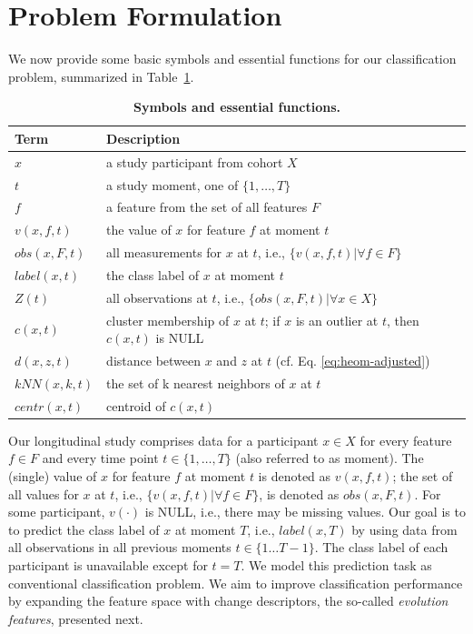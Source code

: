 \documentclass[
  oneside]{book}
\begin{document}
\hypertarget{evo-problem-formulation}{%
\section{Problem Formulation}\label{evo-problem-formulation}}

We now provide some basic symbols and essential functions for our classification problem, summarized in Table~\ref{tab:06-nomenclature}.



\begin{table}

\caption{\label{tab:06-nomenclature}\textbf{Symbols and essential functions.}}
\centering
\begin{tabular}[t]{ll}
\toprule
\textbf{Term} & \textbf{Description}\\
\midrule
$x$ & a study participant from cohort $X$\\
$t$ & a study moment, one of $\{1,\ldots, T\}$\\
$f$ & a feature from the set of all features $F$\\
$v(x,f,t)$ & the value of $x$ for feature $f$ at moment $t$\\
$obs(x,F,t)$ & all measurements for $x$ at $t$, i.e., $\{v(x,f,t)|\forall f\in{}F\}$\\
$label(x,t)$ & the class label of $x$ at moment $t$\\
$Z(t)$ & all observations at $t$, i.e., $\{obs(x,F,t)| \forall x \in X\}$\\
$c(x,t)$ & cluster membership of $x$ at $t$; if $x$ is an outlier at $t$, then $c(x,t)$ is NULL\\
$d(x,z,t)$ & distance between $x$ and $z$ at $t$ (cf. Eq. \ref{eq:heom-adjusted})\\
$kNN(x,k,t)$ & the set of k nearest neighbors of $x$ at  $t$\\
$centr(x,t)$ & centroid of $c(x,t)$\\
\bottomrule
\end{tabular}
\end{table}

Our longitudinal study comprises data for a participant \(x\in X\) for every feature \(f\in F\) and every time point \(t\in \{1,\ldots, T\}\) (also referred to as moment).
The (single) value of \(x\) for feature \(f\) at moment \(t\) is denoted as \(v(x,f,t)\);
the set of all values for \(x\) at \(t\), i.e., \(\{v(x,f,t)|\forall f\in{}F\}\), is denoted as \(obs(x,F,t)\).
For some participant, \(v(\cdot)\) is NULL, i.e., there may be missing values.
Our goal is to to predict the class label of \(x\) at moment \(T\), i.e., \(label(x,T)\) by using data from all observations in all previous moments \(t\in\{1\ldots T-1\}\).
The class label of each participant is unavailable except for \(t=T\).
We model this prediction task as conventional classification problem.
We aim to improve classification performance by expanding the feature space with change descriptors, the so-called \emph{evolution features}, presented next.
\end{document}
